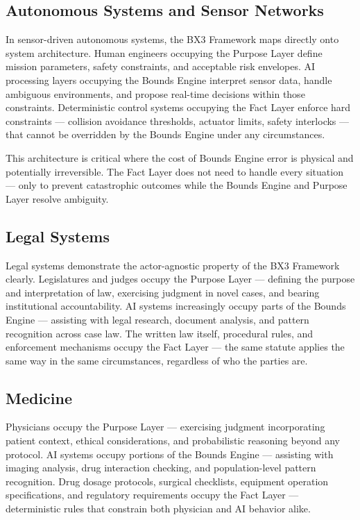 \documentclass[12pt]{article}
\theoremstyle{plain}
\begin{document}
\subsection{Autonomous Systems and Sensor Networks}

In sensor-driven autonomous systems, the BX3 Framework maps directly onto system architecture. Human engineers occupying the Purpose Layer define mission parameters, safety constraints, and acceptable risk envelopes. AI processing layers occupying the Bounds Engine interpret sensor data, handle ambiguous environments, and propose real-time decisions within those constraints. Deterministic control systems occupying the Fact Layer enforce hard constraints --- collision avoidance thresholds, actuator limits, safety interlocks --- that cannot be overridden by the Bounds Engine under any circumstances.

This architecture is critical where the cost of Bounds Engine error is physical and potentially irreversible. The Fact Layer does not need to handle every situation --- only to prevent catastrophic outcomes while the Bounds Engine and Purpose Layer resolve ambiguity.

\subsection{Legal Systems}

Legal systems demonstrate the actor-agnostic property of the BX3 Framework clearly. Legislatures and judges occupy the Purpose Layer --- defining the purpose and interpretation of law, exercising judgment in novel cases, and bearing institutional accountability. AI systems increasingly occupy parts of the Bounds Engine --- assisting with legal research, document analysis, and pattern recognition across case law. The written law itself, procedural rules, and enforcement mechanisms occupy the Fact Layer --- the same statute applies the same way in the same circumstances, regardless of who the parties are.

\subsection{Medicine}

Physicians occupy the Purpose Layer --- exercising judgment incorporating patient context, ethical considerations, and probabilistic reasoning beyond any protocol. AI systems occupy portions of the Bounds Engine --- assisting with imaging analysis, drug interaction checking, and population-level pattern recognition. Drug dosage protocols, surgical checklists, equipment operation specifications, and regulatory requirements occupy the Fact Layer --- deterministic rules that constrain both physician and AI behavior alike.
\end{document}
